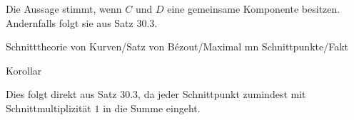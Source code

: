 {


Die Aussage stimmt, wenn $C$ und $D$ eine gemeinsame Komponente besitzen. Andernfalls folgt sie aus
Satz 30.3.


}



{Schnitttheorie von Kurven/Satz von Bézout/Maximal mn Schnittpunkte/Fakt}

{Korollar}

{}

{





\faktzusatz {}

\faktzusatz {}


}

{


Dies folgt direkt aus
Satz 30.3,
da jeder Schnittpunkt zumindest mit Schnittmultiplizität $1$ in die Summe eingeht.


}



